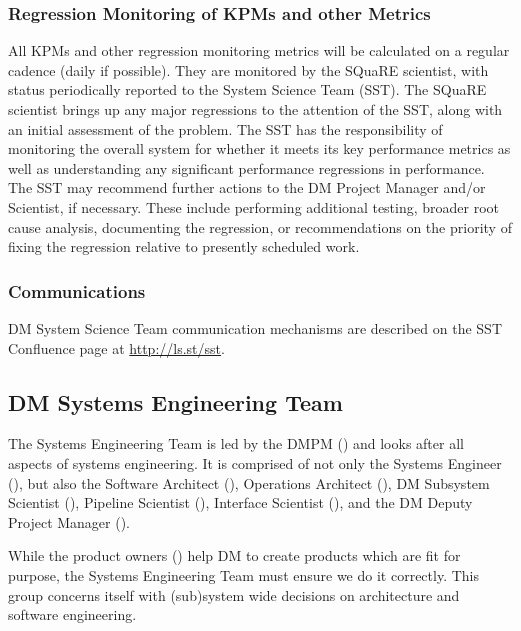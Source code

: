 \subsubsection{Regression Monitoring of KPMs and other Metrics}

All KPMs and other regression monitoring metrics will be calculated on a regular cadence (daily if possible).
They are monitored by the SQuaRE scientist, with status periodically reported to the System Science Team (SST).
The SQuaRE scientist brings up any major regressions to the attention of the SST, along with an initial assessment of the problem.
The SST has the responsibility of monitoring the overall system for whether it meets its key performance metrics as well as understanding any significant performance regressions in performance.
The SST may recommend further actions to the DM Project Manager and/or Scientist, if necessary.
These include performing additional testing, broader root cause analysis, documenting the regression, or recommendations on the priority of fixing the regression relative to presently scheduled work.

\subsubsection{Communications}

DM System Science Team communication mechanisms are described on the SST Confluence page at \url{http://ls.st/sst}.

\subsection{DM Systems Engineering Team \label{sect:sysengt}}

The Systems Engineering Team is led by the DMPM () and looks after all aspects of systems engineering.
It is comprised of not only the Systems Engineer (), but also the Software Architect (), Operations Architect (), DM Subsystem Scientist (), Pipeline Scientist (), Interface Scientist (), and the DM Deputy Project Manager ().

While the product owners () help DM to create products which are fit for purpose, the Systems Engineering Team must ensure we do it correctly. This group concerns itself with (sub)system wide decisions on architecture and software engineering.

